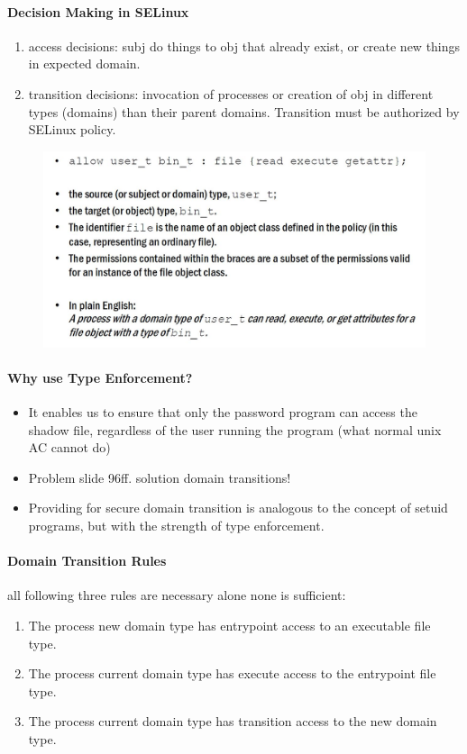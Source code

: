 \paragraph{Decision Making in SELinux}
\begin{enumerate}
    \item access decisions: subj do things to obj that already exist, or create new things in expected domain.
    \item transition decisions: invocation of processes or creation of obj in different types (domains) than their parent domains. Transition must be authorized by SELinux policy. 
\end{enumerate}{}

\begin{figure}[h!]
    \centering
    \includegraphics[scale=0.5]{Figures/SELinuxAC.JPG}
    \label{fig:Access Control}
\end{figure}

\paragraph{Why use Type Enforcement?}
\begin{itemize}
    \item It enables us to ensure that only the password program can access the shadow file, regardless of the user running the program (what normal unix AC cannot do)
    \item Problem slide 96ff. solution domain transitions!
    \item Providing for secure domain transition is analogous to the concept of setuid programs, but with the strength of type enforcement.
\end{itemize}{}

\paragraph{Domain Transition Rules}
all following three rules are necessary alone none is sufficient:
\begin{enumerate}
    \item The process new domain type has entrypoint access to an executable file type.
    \item The process current domain type has execute access to the entrypoint file type.
    \item The process current domain type has transition access to the new domain type.
\end{enumerate}{}

